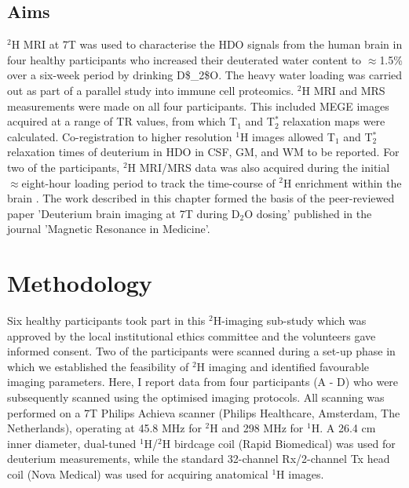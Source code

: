 \subsection{Aims}

$^2$H MRI at 7T was used to characterise the \ac{HDO} signals from the human brain in four healthy participants who increased their deuterated water content to $\approx$1.5\% over a six-week period by drinking \ac{D$_2$O}. The heavy water loading was carried out as part of a parallel study into immune cell proteomics. $^2$H MRI and MRS measurements were made on all four participants. This included \ac{MEGE} images acquired at a range of \ac{TR} values, from which T$_1$ and T$_2^*$ relaxation maps were calculated. Co-registration to higher resolution $^1$H images allowed T$_1$ and T$_2^*$ relaxation times of deuterium in \ac{HDO} in \ac{CSF}, \ac{GM}, and \ac{WM} to be reported. For two of the participants, $^2$H \ac{MRI}/\ac{MRS} data was also acquired during the initial $\approx$eight-hour loading period to track the time-course of $^2$H enrichment within the brain \cite{Cocking2023DeuteriumDosing}. The work described in this chapter formed the basis of the peer-reviewed paper 'Deuterium brain imaging at 7T during D$_2$O dosing' published in the journal 'Magnetic Resonance in Medicine'.


\section{Methodology}

Six healthy participants took part in this $^2$H-imaging sub-study which was approved by the local institutional ethics committee and the volunteers gave informed consent. Two of the participants were scanned during a set-up phase in which we established the feasibility of $^2$H imaging and identified favourable imaging parameters. Here, I report data from four participants (A - D) who were subsequently scanned using the optimised imaging protocols. All scanning was performed on a 7T Philips Achieva scanner (Philips Healthcare, Amsterdam, The Netherlands), operating at 45.8 MHz for $^2$H and 298 MHz for $^1$H. A 26.4 cm inner diameter, dual-tuned $^1$H/$^2$H birdcage coil (Rapid Biomedical) was used for deuterium measurements, while the standard 32-channel Rx/2-channel Tx head coil (Nova Medical) was used for acquiring anatomical $^1$H images.  

